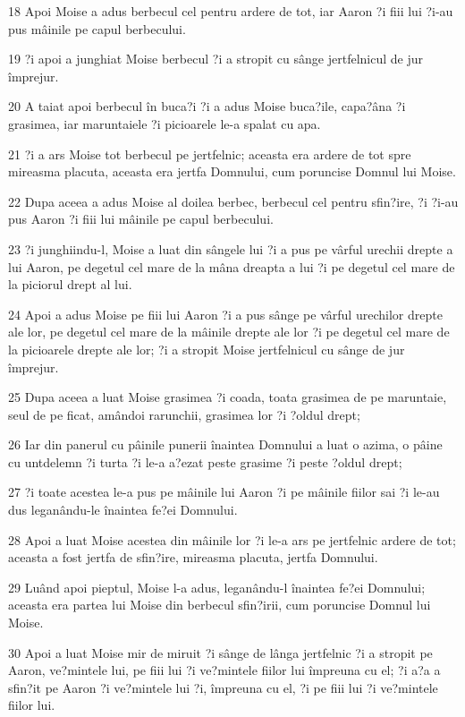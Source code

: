 \par 18 Apoi Moise a adus berbecul cel pentru ardere de tot, iar Aaron ?i fiii lui ?i-au pus mâinile pe capul berbecului.
\par 19 ?i apoi a junghiat Moise berbecul ?i a stropit cu sânge jertfelnicul de jur împrejur.
\par 20 A taiat apoi berbecul în buca?i ?i a adus Moise buca?ile, capa?âna ?i grasimea, iar maruntaiele ?i picioarele le-a spalat cu apa.
\par 21 ?i a ars Moise tot berbecul pe jertfelnic; aceasta era ardere de tot spre mireasma placuta, aceasta era jertfa Domnului, cum poruncise Domnul lui Moise.
\par 22 Dupa aceea a adus Moise al doilea berbec, berbecul cel pentru sfin?ire, ?i ?i-au pus Aaron ?i fiii lui mâinile pe capul berbecului.
\par 23 ?i junghiindu-l, Moise a luat din sângele lui ?i a pus pe vârful urechii drepte a lui Aaron, pe degetul cel mare de la mâna dreapta a lui ?i pe degetul cel mare de la piciorul drept al lui.
\par 24 Apoi a adus Moise pe fiii lui Aaron ?i a pus sânge pe vârful urechilor drepte ale lor, pe degetul cel mare de la mâinile drepte ale lor ?i pe degetul cel mare de la picioarele drepte ale lor; ?i a stropit Moise jertfelnicul cu sânge de jur împrejur.
\par 25 Dupa aceea a luat Moise grasimea ?i coada, toata grasimea de pe maruntaie, seul de pe ficat, amândoi rarunchii, grasimea lor ?i ?oldul drept;
\par 26 Iar din panerul cu pâinile punerii înaintea Domnului a luat o azima, o pâine cu untdelemn ?i turta ?i le-a a?ezat peste grasime ?i peste ?oldul drept;
\par 27 ?i toate acestea le-a pus pe mâinile lui Aaron ?i pe mâinile fiilor sai ?i le-au dus leganându-le înaintea fe?ei Domnului.
\par 28 Apoi a luat Moise acestea din mâinile lor ?i le-a ars pe jertfelnic ardere de tot; aceasta a fost jertfa de sfin?ire, mireasma placuta, jertfa Domnului.
\par 29 Luând apoi pieptul, Moise l-a adus, leganându-l înaintea fe?ei Domnului; aceasta era partea lui Moise din berbecul sfin?irii, cum poruncise Domnul lui Moise.
\par 30 Apoi a luat Moise mir de miruit ?i sânge de lânga jertfelnic ?i a stropit pe Aaron, ve?mintele lui, pe fiii lui ?i ve?mintele fiilor lui împreuna cu el; ?i a?a a sfin?it pe Aaron ?i ve?mintele lui ?i, împreuna cu el, ?i pe fiii lui ?i ve?mintele fiilor lui.

